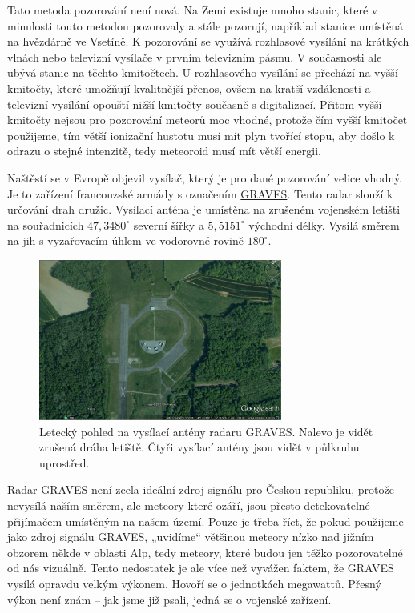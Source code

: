 \documentclass[10pt,a5paper,twoside]{book}
\begin{document}
Tato metoda pozorování není nová. Na Zemi existuje mnoho stanic, které v minulosti touto metodou pozorovaly a stále pozorují, například stanice umístěná na hvězdárně ve Vsetíně. K pozorování se využívá rozhlasové vysílání na krátkých vlnách nebo televizní vysílače v prvním televizním pásmu. V současnosti ale ubývá stanic na těchto kmitočtech. U rozhlasového vysílání se přechází na vyšší kmitočty, které umožňují kvalitnější přenos, ovšem na kratší vzdálenosti a televizní vysílání opouští nižší kmitočty současně s digitalizací. Přitom vyšší kmitočty nejsou pro pozorování meteorů moc vhodné, protože čím vyšší kmitočet použijeme, tím větší ionizační hustotu musí mít plyn tvořící stopu, aby došlo k odrazu o stejné intenzitě, tedy meteoroid musí mít větší energii. 
 
Naštěstí se v Evropě objevil vysílač, který je pro dané pozorování velice vhodný. Je to zařízení francouzské armády s označením \href{http://en.wikipedia.org/wiki/Graves_\%28system\%29}{GRAVES}. Tento radar slouží k určování drah družic. Vysílací anténa je umístěna na zrušeném vojenském letišti na souřadnicích $47,3480^{\circ}$ severní šířky a $5,5151^{\circ}$ východní délky. Vysílá směrem na jih s vyzařovacím úhlem ve vodorovné rovině $180^{\circ}$.
\begin{figure}[htbp]
	\begin{center}
		\includegraphics[width=8cm]{graves/graves_soubory/image002.eps}
	  	\caption{Letecký pohled na vysílací antény radaru GRAVES. Nalevo je vidět zrušená dráha letiště. Čtyři vysílací antény jsou vidět v půlkruhu uprostřed.}
	  	\label{fig:}
	\end{center}
\end{figure}
Radar GRAVES není zcela ideální zdroj signálu pro Českou republiku, protože nevysílá naším směrem, ale meteory které ozáří, jsou přesto detekovatelné přijímačem umístěným na našem území. Pouze je třeba říct, že pokud použijeme jako zdroj signálu GRAVES, „uvidíme“ většinou meteory nízko nad jižním obzorem někde v oblasti Alp, tedy meteory, které budou jen těžko pozorovatelné od nás vizuálně. Tento nedostatek je ale více než vyvážen faktem, že GRAVES vysílá opravdu velkým výkonem. Hovoří se o jednotkách megawattů. Přesný výkon není znám – jak jsme již psali, jedná se o vojenské zařízení.
\end{document}
